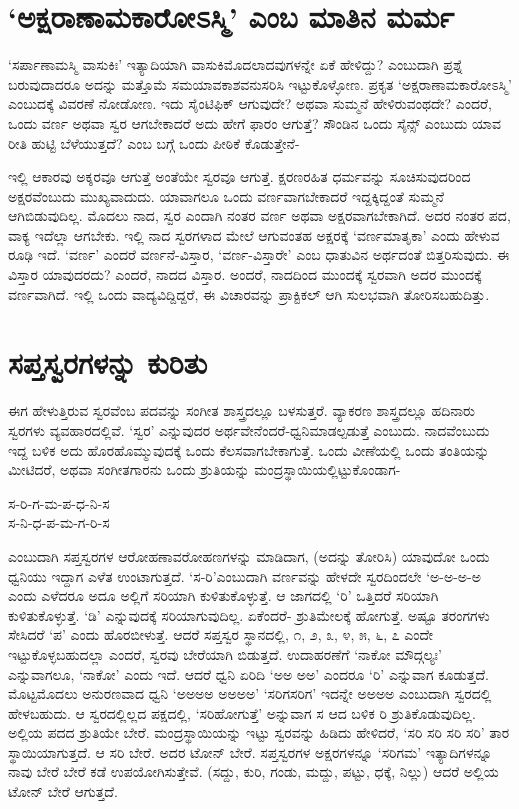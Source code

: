 \section*{`ಅಕ್ಷರಾಣಾಮಕಾರೋಽಸ್ಮಿ' ಎಂಬ ಮಾತಿನ ಮರ್ಮ}

`ಸರ್ಪಾಣಾಮಸ್ಮಿ ವಾಸುಕಿಃ' ಇತ್ಯಾದಿಯಾಗಿ ವಾಸುಕಿಮೊದಲಾದವುಗಳನ್ನೇ ಏಕೆ ಹೇಳಿದ್ದು? ಎಂಬುದಾಗಿ ಪ್ರಶ್ನೆ ಬರುವುದಾದರೂ ಅದನ್ನು ಮತ್ತೊಮೆ ಸಮಯಾವಕಾಶವನುಸರಿಸಿ ಇಟ್ಟುಕೊಳ್ಳೋಣ. ಪ್ರಕೃತ `ಅಕ್ಷರಾಣಾಮಕಾರೋಽಸ್ಮಿ' ಎಂಬುದಕ್ಕೆ ವಿವರಣೆ ನೋಡೋಣ. ಇದು ಸೈಂಟಿಫಿಕ್ ಆಗುವುದೇ? ಅಥವಾ ಸುಮ್ಮನೆ ಹೇಳಿರುವಂಥದೇ? ಎಂದರೆ, ಒಂದು ವರ್ಣ ಅಥವಾ ಸ್ವರ ಆಗಬೇಕಾದರೆ ಅದು ಹೇಗೆ ಫಾರಂ ಆಗುತ್ತೆ? ಸೌಂಡಿನ ಒಂದು ಸೈನ್ಸ್ ಎಂಬುದು ಯಾವ ರೀತಿ ಹುಟ್ಟಿ ಬೆಳೆಯುತ್ತದೆ? ಎಂಬ ಬಗ್ಗೆ ಒಂದು ಪೀಠಿಕೆ ಕೊಡುತ್ತೇನೆ-

ಇಲ್ಲಿ ಆಕಾರವು ಅಕ್ಶರವೂ ಆಗುತ್ತೆ ಅಂತೆಯೇ ಸ್ವರವೂ ಆಗುತ್ತೆ. ಕ್ಷರಣರಹಿತ ಧರ್ಮವನ್ನು ಸೂಚಿಸುವುದರಿಂದ ಅಕ್ಷರವೆಂಬುದು ಮುಖ್ಯವಾದುದು. ಯಾವಾಗಲೂ ಒಂದು ವರ್ಣವಾಗಬೇಕಾದರೆ ಇದ್ದಕ್ಕಿದ್ದಂತೆ ಸುಮ್ಮನೆ ಆಗಿಬಿಡುವುದಿಲ್ಲ. ಮೊದಲು ನಾದ, ಸ್ವರ ಎಂದಾಗಿ ನಂತರ ವರ್ಣ ಅಥವಾ ಅಕ್ಷರವಾಗಬೇಕಾಗಿದೆ. ಅದರ ನಂತರ ಪದ, ವಾಕ್ಯ ಇದೆಲ್ಲಾ ಆಗಬೇಕು. ಇಲ್ಲಿ ನಾದ ಸ್ವರಗಳಾದ ಮೇಲೆ ಆಗುವಂತಹ ಅಕ್ಷರಕ್ಕೆ `ವರ್ಣಮಾತೃಕಾ' ಎಂದು ಹೇಳುವ ರೂಢಿ ಇದೆ. `ವರ್ಣ' ಎಂದರೆ ವರ್ಣನೆ-ವಿಸ್ತಾರ, `ವರ್ಣ-ವಿಸ್ತಾರೇ' ಎಂಬ ಧಾತುವಿನ ಅರ್ಥದಂತೆ ಬಿತ್ತರಿಸುವುದು. ಈ ವಿಸ್ತಾರ ಯಾವುದರದು? ಎಂದರೆ, ನಾದದ ವಿಸ್ತಾರ. ಅಂದರೆ, ನಾದದಿಂದ ಮುಂದಕ್ಕೆ ಸ್ವರವಾಗಿ ಅದರ ಮುಂದಕ್ಕೆ ವರ್ಣವಾಗಿದೆ. ಇಲ್ಲಿ ಒಂದು ವಾದ್ಯವಿದ್ದಿದ್ದರೆ, ಈ ವಿಚಾರವನ್ನು ಪ್ರಾಕ್ಟಿಕಲ್ ಆಗಿ ಸುಲಭವಾಗಿ ತೋರಿಸಬಹುದಿತ್ತು.

\section*{ಸಪ್ತಸ್ವರಗಳನ್ನು ಕುರಿತು}

ಈಗ ಹೇಳುತ್ತಿರುವ ಸ್ವರವೆಂಬ ಪದವನ್ನು ಸಂಗೀತ ಶಾಸ್ತ್ರದಲ್ಲೂ ಬಳಸುತ್ತರೆ. ವ್ಯಾಕರಣ ಶಾಸ್ತ್ರದಲ್ಲೂ ಹದಿನಾರು ಸ್ವರಗಳು ವ್ಯವಹಾರದಲ್ಲಿವೆ. `ಸ್ವರ' ಎನ್ನುವುದರ ಅರ್ಥವೇನೆಂದರೆ-ಧ್ವನಿಮಾಡಲ್ಪಡುತ್ತೆ ಎಂಬುದು. ನಾದವೆಂಬುದು ಇದ್ದ ಬಳಿಕ ಅದು ಹೊರಹೊಮ್ಮುವುದಕ್ಕೆ ಒಂದು ಕೆಲಸವಾಗಬೇಕಾಗುತ್ತೆ. ಒಂದು ವೀಣೆಯಲ್ಲಿ ಒಂದು ತಂತಿಯನ್ನು ಮೀಟಿದರೆ, ಅಥವಾ ಸಂಗೀತಗಾರನು ಒಂದು ಶ್ರುತಿಯನ್ನು ಮಂದ್ರಸ್ಥಾಯಿಯಲ್ಲಿಟ್ಟುಕೊಂಡಾಗ-

\begin{shloka}
ಸ-ರಿ-ಗ-ಮ-ಪ-ಧ-ನಿ-ಸ\\
ಸ-ನಿ-ಧ-ಪ-ಮ-ಗ-ರಿ-ಸ
\end{shloka}
ಎಂಬುದಾಗಿ ಸಪ್ತಸ್ವರಗಳ ಆರೋಹಣಾವರೋಹಣಗಳನ್ನು ಮಾಡಿದಾಗ, (ಅದನ್ನು ತೋರಿಸಿ) ಯಾವುದೋ ಒಂದು ಧ್ವನಿಯು ಇದ್ದಾಗ ಎಳೆತ ಉಂಟಾಗುತ್ತದೆ. `ಸ-ರಿ'ಎಂಬುದಾಗಿ ವರ್ಣವನ್ನು ಹೇಳದೇ ಸ್ವರದಿಂದಲೇ `ಅ-ಅ-ಅ-ಅ ಎಂದು ಎಳೆದರೂ ಅದೂ ಅಲ್ಲಿಗೆ ಸರಿಯಾಗಿ ಕುಳಿತುಕೊಳ್ಳುತ್ತೆ. ಆ ಜಾಗದಲ್ಲಿ `ರಿ' ಒತ್ತಿದರೆ ಸರಿಯಾಗಿ ಕುಳಿತುಕೊಳ್ಳುತ್ತೆ. `ಡಿ' ಎನ್ನುವುದಕ್ಕೆ ಸರಿಯಾಗುವುದಿಲ್ಲ. ಏಕೆಂದರೆ- ಶ್ರುತಿಮೇಲಕ್ಕೆ ಹೋಗುತ್ತೆ. ಅಷ್ಟೂ ತರಂಗಗಳು ಸೇಸಿದರೆ `ಪ' ಎಂದು ಹೊರಬೀಳುತ್ತೆ. ಆದರೆ ಸಪ್ತಸ್ವರ ಸ್ಥಾನದಲ್ಲಿ, ೧, ೨, ೩, ೪, ೫, ೬, ೭ ಎಂದೇ ಇಟ್ಟುಕೊಳ್ಳಬಹುದಲ್ಲಾ ಎಂದರೆ, ಸ್ವರವು ಬೇರೆಯಾಗಿ ಬಿಡುತ್ತದೆ. ಉದಾಹರಣೆಗೆ `ನಾಕೋ ಮೌದ್ಗಲ್ಯಃ' ಎನ್ನುವಾಗಲೂ, `ನಾಕೋ' ಎಂದು ಇದೆ. ಆದರೆ ಧ್ವನಿ ಏರಿದಿ `ಅ‌ಅ  ಅ‌ಅ' ಎಂದರೂ `ರಿ' ಎನ್ನುವಾಗ ಕೂಡುತ್ತದೆ. ಮೊಟ್ಟಮೊದಲು ಅನುರಣವಾದ ಧ್ವನಿ `ಅ‌ಅಅ‌ಅ ಅ‌ಅಅ‌ಅ' `ಸರಿಗಸರಿಗ' ಇದನ್ನೇ ಅ‌ಅಅ‌ಅ ಎಂಬುದಾಗಿ ಸ್ವರದಲ್ಲಿ ಹೇಳಬಹುದು. ಆ ಸ್ವರದಲ್ಲಿಲ್ಲದ ಪಕ್ಷದಲ್ಲಿ, `ಸರಿಹೋಗುತ್ತೆ' ಅನ್ನುವಾಗ ಸ ಆದ ಬಳಿಕ ರಿ ಶ್ರುತಿಕೊಡುವುದಿಲ್ಲ. ಅಲ್ಲಿಯ ಪದದ ಶ್ರುತಿಯೇ ಬೇರೆ. ಮಂದ್ರಸ್ಥಾಯಿಯನ್ನು ಇಟ್ಟು ಸ್ವರವನ್ನು ಹಿಡಿದು ಹೇಳಿದರೆ, `ಸರಿ ಸರಿ ಸರಿ ಸರಿ' ತಾರ ಸ್ಥಾಯಿಯಾಗುತ್ತದೆ. ಆ ಸರಿ ಬೇರೆ. ಅದರ ಟೋನ್ ಬೇರೆ. ಸಪ್ತಸ್ವರಗಳ ಅಕ್ಷರಗಳನ್ನೂ `ಸರಿಗಮ' ಇತ್ಯಾದಿಗಳನ್ನೂ ನಾವು ಬೇರೆ ಬೇರೆ ಕಡೆ ಉಪಯೋಗಿಸುತ್ತೇವೆ. (ಸದ್ದು, ಕುರಿ, ಗಂಡು, ಮದ್ದು, ಪಟ್ಟು, ಧಕ್ಕೆ, ನಿಲ್ಲು) ಆದರೆ ಅಲ್ಲಿಯ ಟೋನ್ ಬೇರೆ ಆಗುತ್ತದೆ.


